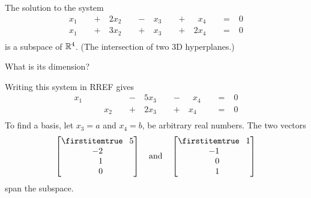 \documentclass{beamer}
\begin{document}
\begin{frame}
\begin{example}
The solution to the system
\begin{equation*}
\begin{aligned}
x_1 &\phantom{x_1} + & 2x_2 &\phantom{x_2} - & x_3 &\phantom{x_3} + & \phantom{2}x_4 &\phantom{x_4} = & 0\\
x_1 &\phantom{x_1} + & 3x_2 &\phantom{x_2} + & x_3 &\phantom{x_3} + & 2x_4 &\phantom{x_4} = & 0\\
\end{aligned}
\end{equation*}
is a subspace of $\mathbb{R}^4$. (The intersection of two 3D hyperplanes.) 

\vspace{2mm}
What is its dimension?

\vspace{2mm}
\begin{overprint}
Writing this system in RREF gives
\begin{equation*}
\begin{aligned}
x_1 &\phantom{x_1} &  &\phantom{x_2} - & 5x_3 &\phantom{x_3} - & \phantom{2}x_4 &\phantom{x_4} = & 0\\
 & & x_2 &\phantom{x_2} + & 2x_3 &\phantom{x_3} + & x_4 &\phantom{x_4} = & 0\\
\end{aligned}
\end{equation*}
To find a basis, let $x_3=a$ and $x_4=b$, be arbitrary real numbers.
The two vectors
\begin{equation*}
\bvector{\+5,-2,\+1,\+0}\quad\text{and}\quad\bvector{\+1,-1,\+0,\+1}
\end{equation*}
span the subspace. 

\vspace{2mm}

\vspace{2mm}
\end{overprint}
\end{example}
\end{frame}
\end{document}
